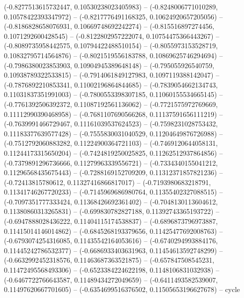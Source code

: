 (-0.8277513615732447, 0.10530238023405983) -- (-0.8248006771010289, 0.10578422393347972) -- (-0.8217776491168325, 0.10624920657205056) -- (-0.8186828658076931, 0.10669748692242274) -- (-0.815516897274456, 0.1071292600428545) -- (-0.8122802957222074, 0.10754475366443267) -- (-0.8089735958442575, 0.10794422488510154) -- (-0.8055973153528719, 0.10832795714564876) -- (-0.8021519556183788, 0.10869625746294694) -- (-0.7986380023853903, 0.10904945389648148) -- (-0.795055926540759, 0.10938789322533815) -- (-0.7914061849127983, 0.1097119388142047) -- (-0.7876892210853341, 0.11002196864844685) -- (-0.7839054662134743, 0.11031837351991003) -- (-0.7800553398307185, 0.11060155534665145) -- (-0.7761392506392372, 0.11087192561136062) -- (-0.7721575972769669, 0.11112990390468958) -- (-0.7681107690566268, 0.11137591656111219) -- (-0.7639991466729467, 0.11161039537624523) -- (-0.7598231028753432, 0.11183377639577428) -- (-0.7555830031040529, 0.11204649876726988) -- (-0.7512792060883282, 0.11224900364721103) -- (-0.7469120644058131, 0.11244173315650204) -- (-0.7424819250025825, 0.11262512937864856) -- (-0.7379891296736666, 0.11279963339556721) -- (-0.7334340155041212, 0.11296568435675443) -- (-0.7288169152709209, 0.11312371857821236) -- (-0.72413815780612, 0.11327416866817017) -- (-0.7193980683218791, 0.11341746267720233) -- (-0.7145969686980764, 0.11355402327088515) -- (-0.7097351777333424, 0.11368426692361402) -- (-0.7048130113604612, 0.11380860313265831) -- (-0.699830782827188, 0.11392743365193722) -- (-0.6947888028436222, 0.11404115174538837) -- (-0.6896873796973887, 0.11415014146014862) -- (-0.6845268193379656, 0.11425477692008763) -- (-0.6793074254316085, 0.11435542164053616) -- (-0.6740294993884176, 0.11445242786532377) -- (-0.6686933403631963, 0.11454613592748299) -- (-0.6632992452318576, 0.11463687363521875) -- (-0.657847508545231, 0.11472495568493306) -- (-0.6523384224622198, 0.1148106831032938) -- (-0.6467722766643587, 0.11489434272049659) -- (-0.6411493582539007, 0.11497620667701605) -- (-0.6354699516376502, 0.11505653196627678) -- cycle
